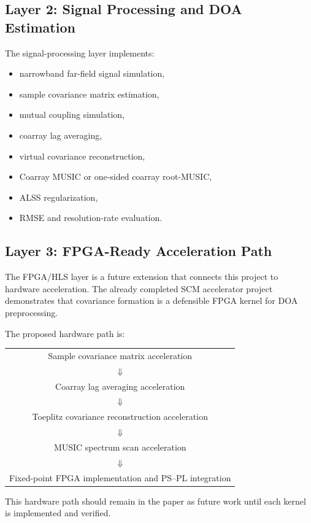 \documentclass[11pt,letterpaper]{article}
\newcommand{\ALSS}{\textsc{ALSS}}
\begin{document}
\subsection{Layer 2: Signal Processing and DOA Estimation}

The signal-processing layer implements:
\begin{itemize}[leftmargin=*]
    \item narrowband far-field signal simulation,
    \item sample covariance matrix estimation,
    \item mutual coupling simulation,
    \item coarray lag averaging,
    \item virtual covariance reconstruction,
    \item Coarray MUSIC or one-sided coarray root-MUSIC,
    \item \ALSS{} regularization,
    \item RMSE and resolution-rate evaluation.
\end{itemize}

\subsection{Layer 3: FPGA-Ready Acceleration Path}

The FPGA/HLS layer is a future extension that connects this project to hardware acceleration. The already completed SCM accelerator project demonstrates that covariance formation is a defensible FPGA kernel for DOA preprocessing.

The proposed hardware path is:
\begin{center}
\begin{tabular}{c}
Sample covariance matrix acceleration \\
$\Downarrow$ \\
Coarray lag averaging acceleration \\
$\Downarrow$ \\
Toeplitz covariance reconstruction acceleration \\
$\Downarrow$ \\
MUSIC spectrum scan acceleration \\
$\Downarrow$ \\
Fixed-point FPGA implementation and PS--PL integration
\end{tabular}
\end{center}

This hardware path should remain in the paper as future work until each kernel is implemented and verified.
\end{document}
